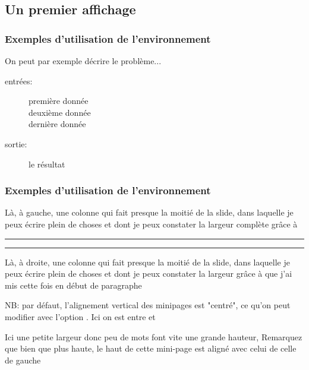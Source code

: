 \subsection{Un premier affichage}
\begin{frame}
  \frametitle{Exemples d'utilisation de l'environnement }
  On peut par exemple décrire le problème...
  \begin{description}
    \item[entrées:] première donnée\\
    deuxième donnée\\
    dernière donnée\\
    \item[sortie:] le résultat
  \end{description}
\end{frame}

\begin{frame}
  \frametitle{Exemples d'utilisation de l'environnement }
  
  \begin{minipage}{0.48\textwidth}
    Là, à gauche, une colonne qui fait presque la moitié de la slide, dans laquelle je peux écrire plein de choses et dont je peux constater la largeur complète grâce à 
    \lin{\hrule} \hrule
  \end{minipage}
  \hspace*{0.2cm}
  \begin{minipage}{0.48\textwidth}
    \hrule
    Là, à droite, une colonne qui fait presque la moitié de la slide, dans laquelle je peux écrire plein de choses et dont je peux constater la largeur grâce à \lin{\hrule}
    que j'ai mis cette fois en début de paragraphe
  \end{minipage}

  \vspace*{0.4cm}

  \begin{minipage}[t]{0.64\textwidth}
    NB: par défaut, l'alignement vertical des minipages est "centré", ce qu'on peut modifier avec l'option \lin{[t]}. 
    Ici on est entre 
    et \lin{\end{minipage}}
  \end{minipage}
  \hspace*{0.2cm}
  \begin{minipage}[t]{0.32\textwidth}
    Ici une petite largeur donc peu de mots font vite une grande hauteur,
    Remarquez que bien que plus haute, le haut de cette mini-page est aligné avec celui de celle de gauche
  \end{minipage}
\end{frame}

